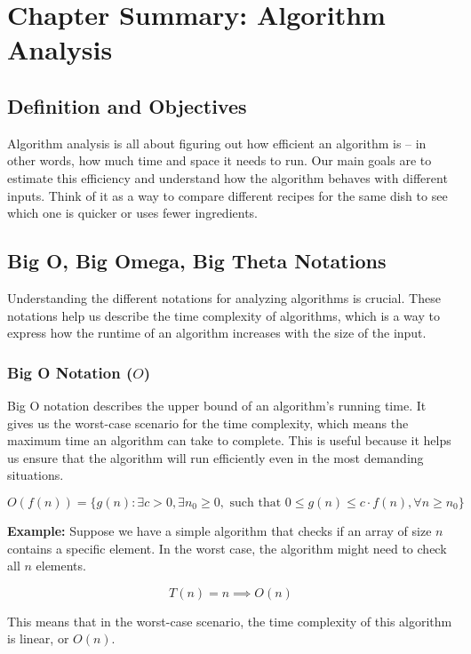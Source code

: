 \documentclass[12pt]{book} %
\begin{document}
\section{Chapter Summary: Algorithm Analysis}

\subsection{Definition and Objectives}
Algorithm analysis is all about figuring out how efficient an algorithm is – in other words, how much time and space it needs to run. Our main goals are to estimate this efficiency and understand how the algorithm behaves with different inputs. Think of it as a way to compare different recipes for the same dish to see which one is quicker or uses fewer ingredients.

\subsection{Big O, Big Omega, Big Theta Notations}

Understanding the different notations for analyzing algorithms is crucial. These notations help us describe the time complexity of algorithms, which is a way to express how the runtime of an algorithm increases with the size of the input.

\subsubsection{Big O Notation ($O$)}

Big O notation describes the upper bound of an algorithm's running time. It gives us the worst-case scenario for the time complexity, which means the maximum time an algorithm can take to complete. This is useful because it helps us ensure that the algorithm will run efficiently even in the most demanding situations.

\[
O(f(n)) = \{ g(n) : \exists c > 0, \exists n_0 \geq 0, \text{ such that } 0 \leq g(n) \leq c \cdot f(n), \forall n \geq n_0 \}
\]

\textbf{Example:} Suppose we have a simple algorithm that checks if an array of size $n$ contains a specific element. In the worst case, the algorithm might need to check all $n$ elements.

\[
T(n) = n \implies O(n)
\]

This means that in the worst-case scenario, the time complexity of this algorithm is linear, or $O(n)$.
\end{document}
